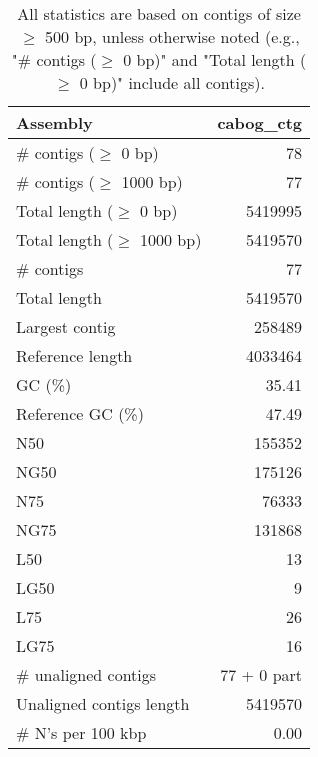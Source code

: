 \documentclass[12pt,a4paper]{article}
\begin{document}
\begin{table}[ht]
\begin{center}
\caption{All statistics are based on contigs of size $\geq$ 500 bp, unless otherwise noted (e.g., "\# contigs ($\geq$ 0 bp)" and "Total length ($\geq$ 0 bp)" include all contigs).}
\begin{tabular}{|l*{1}{|r}|}
\hline
Assembly & cabog\_ctg \\ \hline
\# contigs ($\geq$ 0 bp) & 78 \\ \hline
\# contigs ($\geq$ 1000 bp) & 77 \\ \hline
Total length ($\geq$ 0 bp) & 5419995 \\ \hline
Total length ($\geq$ 1000 bp) & 5419570 \\ \hline
\# contigs & 77 \\ \hline
Total length & 5419570 \\ \hline
Largest contig & 258489 \\ \hline
Reference length & 4033464 \\ \hline
GC (\%) & 35.41 \\ \hline
Reference GC (\%) & 47.49 \\ \hline
N50 & 155352 \\ \hline
NG50 & 175126 \\ \hline
N75 & 76333 \\ \hline
NG75 & 131868 \\ \hline
L50 & 13 \\ \hline
LG50 & 9 \\ \hline
L75 & 26 \\ \hline
LG75 & 16 \\ \hline
\# unaligned contigs & 77 + 0 part \\ \hline
Unaligned contigs length & 5419570 \\ \hline
\# N's per 100 kbp & 0.00 \\ \hline
\end{tabular}
\end{center}
\end{table}
\end{document}
